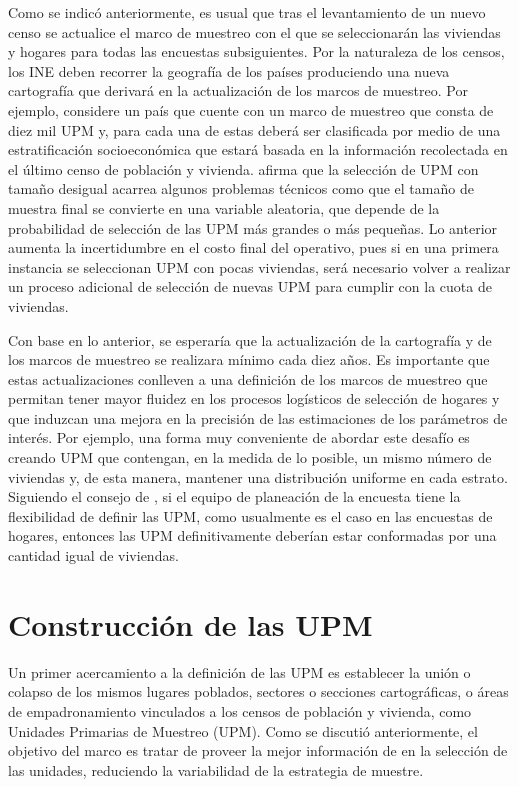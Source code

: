 \documentclass[
  10pt,
  spanish,
]{book}
\begin{document}
Como se indicó anteriormente, es usual que tras el levantamiento de un nuevo censo se actualice el marco de muestreo con el que se seleccionarán las viviendas y hogares para todas las encuestas subsiguientes. Por la naturaleza de los censos, los INE deben recorrer la geografía de los países produciendo una nueva cartografía que derivará en la actualización de los marcos de muestreo. Por ejemplo, considere un país que cuente con un marco de muestreo que consta de diez mil UPM y, para cada una de estas deberá ser clasificada por medio de una estratificación socioeconómica que estará basada en la información recolectada en el último censo de población y vivienda. \citet[pág. 183]{Kish_1965} afirma que la selección de UPM con tamaño desigual acarrea algunos problemas técnicos como que el tamaño de muestra final se convierte en una variable aleatoria, que depende de la probabilidad de selección de las UPM más grandes o más pequeñas. Lo anterior aumenta la incertidumbre en el costo final del operativo, pues si en una primera instancia se seleccionan UPM con pocas viviendas, será necesario volver a realizar un proceso adicional de selección de nuevas UPM para cumplir con la cuota de viviendas.

Con base en lo anterior, se esperaría que la actualización de la cartografía y de los marcos de muestreo se realizara mínimo cada diez años. Es importante que estas actualizaciones conlleven a una definición de los marcos de muestreo que permitan tener mayor fluidez en los procesos logísticos de selección de hogares y que induzcan una mejora en la precisión de las estimaciones de los parámetros de interés. Por ejemplo, una forma muy conveniente de abordar este desafío es creando UPM que contengan, en la medida de lo posible, un mismo número de viviendas y, de esta manera, mantener una distribución uniforme en cada estrato. Siguiendo el consejo de \citet[pág. 212]{Valliant_Dever_Kreuter_2013}, si el equipo de planeación de la encuesta tiene la flexibilidad de definir las UPM, como usualmente es el caso en las encuestas de hogares, entonces las UPM definitivamente deberían estar conformadas por una cantidad igual de viviendas.

\hypertarget{construcciuxf3n-de-las-upm}{%
\section{Construcción de las UPM}\label{construcciuxf3n-de-las-upm}}

Un primer acercamiento a la definición de las UPM es establecer la unión o colapso de los mismos lugares poblados, sectores o secciones cartográficas, o áreas de empadronamiento vinculados a los censos de población y vivienda, como Unidades Primarias de Muestreo (UPM). Como se discutió anteriormente, el objetivo del marco es tratar de proveer la mejor información de en la selección de las unidades, reduciendo la variabilidad de la estrategia de muestre.
\end{document}
